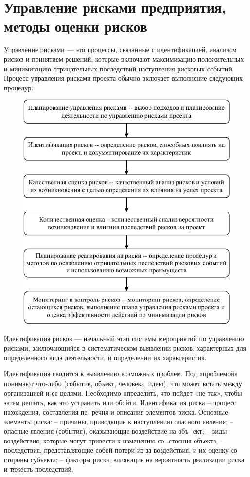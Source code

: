 \section{Управление рисками предприятия, методы оценки рисков}

Управление рисками --- это процессы, связанные с идентификацией, анализом рисков и принятием решений, которые включают максимизацию положительных и минимизацию отрицательных последствий наступления рисковых событий. Процесс управления рисками проекта обычно включает выполнение следующих процедур:
\begin{figure}
	\centering
	\includegraphics[width=0.7\linewidth]{Diagram-Page-2}
	\caption*{}
	\label{fig:diagram-page-2}
\end{figure}

Идентификация рисков --- начальный этап системы мероприятий по управлению рисками, заключающийся в систематическом выявлении рисков, характерных для определенного вида деятельности, и определении их характеристик.

Идентификация сводится к выявлению возможных проблем. 
Под «проблемой» понимают что-либо (событие, объект, человека, идею), что может встать между организацией и ее целями.
Необходимо определить, что пойдет «не так», чтобы затем решить, как это устранить
или обойти.
Идентификация риска – процесс нахождения, составления пе-
речня и описания элементов риска.
Основные элементы риска:
– причины, приводящие к наступлению опасного явления;
– опасные явления (события), оказывающие воздействие на объ-
ект;
– виды воздействия, которые могут привести к изменению со-
стояния объекта;
– последствия, представляющие собой потери из-за воздействия,
и их оценку со стороны субъекта;
– факторы риска, влияющие на вероятность реализации риска
и тяжесть последствий.
